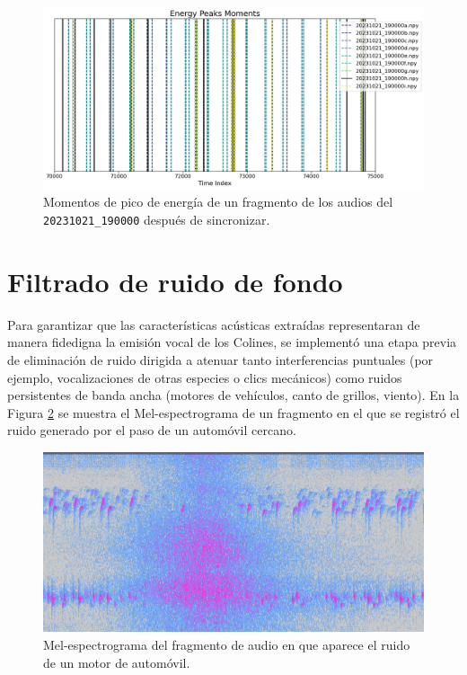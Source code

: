 \begin{figure}[ht]
    \centering
    \includegraphics[width=0.9\linewidth]{Graphics/peaks_after.png}
    \caption{Momentos de pico de energía de un fragmento de los audios del \texttt{20231021\_190000} después de sincronizar.}
    \label{fig:peaksafter}
  \end{figure}





\section{Filtrado de ruido de fondo}
\label{sec:filtrado}


Para garantizar que las características acústicas extraídas 
representaran de manera fidedigna la emisión vocal de los 
Colines, se implementó una etapa previa de eliminación de 
ruido dirigida a atenuar tanto interferencias puntuales (por 
ejemplo, vocalizaciones de otras especies o clics mecánicos) 
como ruidos persistentes de banda ancha (motores de vehículos, 
canto de grillos, viento). En la 
Figura \ref{fig:car} se muestra el Mel-espectrograma de un 
fragmento en el que se registró el ruido generado por el paso 
de un automóvil cercano.


\begin{figure}[ht]
    \centering
    \includegraphics[width=\columnwidth]{Graphics/car_noise.png}
    \caption{Mel-espectrograma del fragmento de audio en que aparece el ruido de un motor de automóvil.}
    \label{fig:car}
\end{figure}


